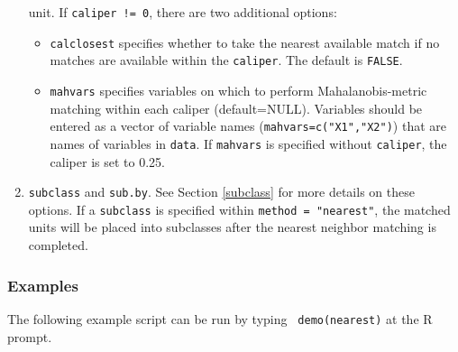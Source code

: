 \documentclass[oneside,letterpaper,titlepage]{article}
\begin{document}
\begin{enumerate}
  unit.  If \texttt{caliper != 0}, there are two additional options:
  \begin{itemize} 
  \item \texttt{calclosest} specifies whether to take the nearest
    available match if no matches are available within the
    \texttt{caliper}. The default is {\tt FALSE}.
  \item \texttt{mahvars} specifies variables on which to perform
    Mahalanobis-metric matching within each caliper (default=NULL).
    Variables should be entered as a vector of variable names
    (\texttt{mahvars=c("X1","X2")}) that are names of variables in
    \texttt{data}.  If \texttt{mahvars} is specified without
    \texttt{caliper}, the caliper is set to 0.25.
  \end{itemize}
\item \texttt{subclass} and \texttt{sub.by}.  See Section
  \ref{subclass} for more details on these options.  If a
  \texttt{subclass} is specified within \texttt{method = "nearest"},
  the matched units will be placed into subclasses after the nearest
  neighbor matching is completed.
\end{enumerate}

\subsubsection{Examples}

The following example script can be run by typing {\tt
    demo(nearest)} at the R prompt.
\end{document}

